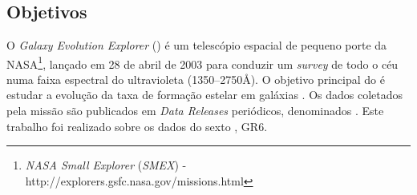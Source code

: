 


\chapter{\galex}
\label{sec:Galex}



\section{Objetivos}
\label{sec:Galex:Objetivos}

O {\em Galaxy Evolution Explorer} (\galex) é um telescópio espacial de pequeno
porte da NASA\footnote{{\em NASA Small Explorer} ({\em SMEX}) -
http://explorers.gsfc.nasa.gov/missions.html}, lançado em 28 de abril de 2003
para conduzir um {\em survey} de todo o céu numa faixa espectral do ultravioleta
(1350--2750\AA). O objetivo principal do \galex é estudar a evolução da taxa de
formação estelar em galáxias \citep{Martin2005}. Os dados coletados pela missão
são publicados em {\em Data Releases} periódicos, denominados . Este trabalho foi realizado sobre os dados do sexto , GR6.

